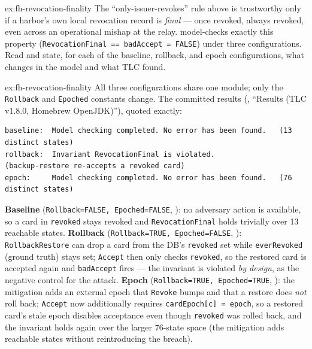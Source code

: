 \documentclass[11pt,a4paper]{article}
\theoremstyle{definition}
\theoremstyle{remark}
\begin{document}

\begin{pdexercise}[kind=Trace,rating=2]{ex:fh-revocation-finality}
The ``only-issuer-revokes'' rule above is trustworthy only if a harbor's own local revocation record is \emph{final} --- once revoked, always revoked, even across an operational mishap at the relay.  model-checks exactly this property (\texttt{RevocationFinal == badAccept = FALSE}) under three configurations. Read  and state, for each of the baseline, rollback, and epoch configurations, what changes in the model and what TLC found.
\end{pdexercise}
\begin{pdsolution}{ex:fh-revocation-finality}
All three configurations share one module; only the \texttt{Rollback} and \texttt{Epoched} constants change. The committed results (, ``Results (TLC v1.8.0, Homebrew OpenJDK)''), quoted exactly:
\begin{lstlisting}
baseline:  Model checking completed. No error has been found.   (13 distinct states)
rollback:  Invariant RevocationFinal is violated.               (backup-restore re-accepts a revoked card)
epoch:     Model checking completed. No error has been found.   (76 distinct states)
\end{lstlisting}
\textbf{Baseline} (\texttt{Rollback=FALSE, Epoched=FALSE}, ): no adversary action is available, so a card in \texttt{revoked} stays revoked and \texttt{RevocationFinal} holds trivially over 13 reachable states. \textbf{Rollback} (\texttt{Rollback=TRUE, Epoched=FALSE}, ): \texttt{RollbackRestore} can drop a card from the DB's \texttt{revoked} set while \texttt{everRevoked} (ground truth) stays set; \texttt{Accept} then only checks \texttt{revoked}, so the restored card is accepted again and \texttt{badAccept} fires --- the invariant is violated \emph{by design}, as the negative control for the attack. \textbf{Epoch} (\texttt{Rollback=TRUE, Epoched=TRUE}, ): the mitigation adds an external epoch that \texttt{Revoke} bumps and that a restore does \emph{not} roll back; \texttt{Accept} now additionally requires \texttt{cardEpoch[c] = epoch}, so a restored card's stale epoch disables acceptance even though \texttt{revoked} was rolled back, and the invariant holds again over the larger 76-state space (the mitigation adds reachable states without reintroducing the breach).


\end{pdsolution}
\end{document}
